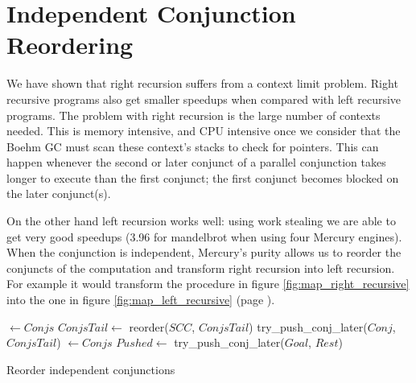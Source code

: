 
\section{Independent Conjunction Reordering}
\label{sec:rts_reorder}

We have shown that right recursion suffers from a context limit problem.
Right recursive programs also get smaller speedups when compared with left
recursive programs.
The problem with right recursion is the large number of contexts needed.
This is memory intensive, and CPU intensive once we consider that
the Boehm GC must scan these context's stacks to check for pointers.
This can happen whenever the second or later
conjunct of a parallel conjunction
takes longer to execute than the first conjunct;
the first conjunct becomes blocked on the later conjunct(s).

On the other hand left recursion works well:
using work stealing we are able to get very good speedups (3.96 for
mandelbrot when using four Mercury engines).
When the conjunction is independent,
Mercury's purity allows us to reorder the conjuncts of the computation and
transform right recursion into left recursion.
For example it would transform the procedure in figure
\ref{fig:map_right_recursive} into the one in figure
\ref{fig:map_left_recursive} (page \pageref{fig:map_right_recursive}).

\begin{algorithm}
\begin{algorithmic}[1]
        \State \Return \nil
    \Else
        \State {} $\gets Conjs$
        \State $ConjsTail \gets$ reorder($SCC$, $ConjsTail$)
            \State \Return {}
        \Else
            \State \Return try\_push\_conj\_later($Conj$, $ConjsTail$)
        \EndIf
    \EndIf
\EndProcedure
{}
        \State \Return {}
    \Else
        \State {} $\gets Conjs$
            \State $Pushed \gets$ try\_push\_conj\_later($Goal$, $Rest$)
            \State \Return {}
        \Else
            \State \Return {}
        \EndIf
    \EndIf
\EndProcedure
\end{algorithmic}
\caption{Reorder independent conjunctions}
\label{alg:reorder_conjunction}
\end{algorithm}

